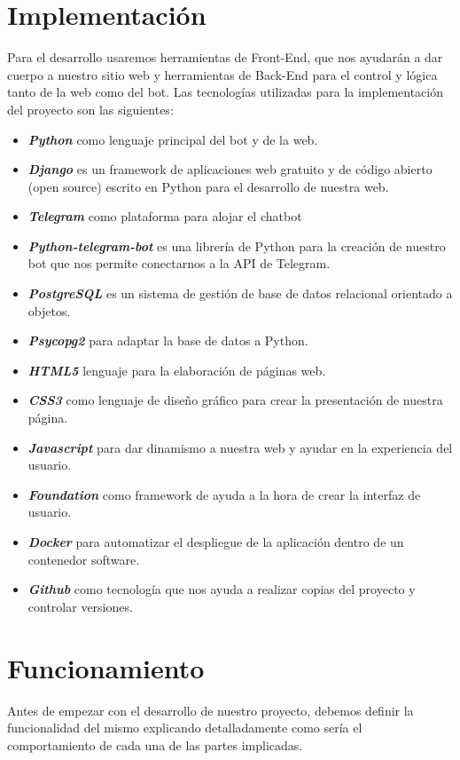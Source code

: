 \section{Implementación}
Para el desarrollo usaremos herramientas de Front-End, que nos ayudarán a dar cuerpo a nuestro sitio web y herramientas de Back-End para el control y lógica tanto de la web como del bot. Las tecnologías utilizadas para la implementación del proyecto son las siguientes:

\begin{itemize}
\item \textit{\textbf{Python}} como lenguaje principal del bot y de la web.
\item \textit{\textbf{Django}} es un framework de aplicaciones web gratuito y de código abierto (open source) escrito en Python para el desarrollo de nuestra web.
\item \textit{\textbf{Telegram}} como plataforma para alojar el chatbot
\item \textit{\textbf{Python-telegram-bot}} es una librería de Python para la creación de nuestro bot que nos permite conectarnos a la API de Telegram.
\item \textit{\textbf{PostgreSQL}} es un sistema de gestión de base de datos relacional orientado a objetos.
\item \textit{\textbf{Psycopg2}} para adaptar la base de datos a Python.
\item \textit{\textbf{HTML5}} lenguaje para la elaboración de páginas web.
\item \textit{\textbf{CSS3}} como lenguaje de diseño gráfico para crear la presentación de nuestra página.
\item \textit{\textbf{Javascript}} para dar dinamismo a nuestra web y ayudar en la experiencia del usuario.
\item \textit{\textbf{Foundation}} como framework de ayuda a la hora de crear la interfaz de usuario.
\item \textit{\textbf{Docker}} para automatizar el despliegue de la aplicación dentro de un contenedor software.
\item \textit{\textbf{Github}} como tecnología que nos ayuda a realizar copias del proyecto y controlar versiones.
\end{itemize}


\section{Funcionamiento}
Antes de empezar con el desarrollo de nuestro proyecto, debemos definir la funcionalidad del mismo explicando detalladamente como sería el comportamiento de cada una de las partes implicadas.

